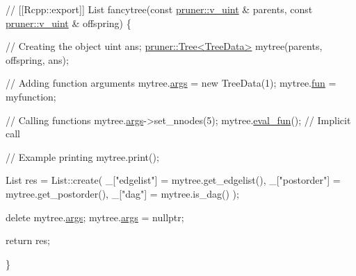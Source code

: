 \begin{DoxyCodeInclude}
{{{{\textcolor{comment}{// [[Rcpp::export]]}
List fancytree(\textcolor{keyword}{const} \hyperlink{namespacepruner_af0145646bd7ede012cd336b416bc5579}{pruner::v\_uint} & parents, \textcolor{keyword}{const} 
      \hyperlink{namespacepruner_af0145646bd7ede012cd336b416bc5579}{pruner::v\_uint} & offspring) \{
  
  \textcolor{comment}{// Creating the object}
  uint ans;
  \hyperlink{classpruner_1_1Tree}{pruner::Tree<TreeData>} mytree(parents, offspring, ans);
  
  \textcolor{comment}{// Adding function arguments}
  mytree.\hyperlink{classpruner_1_1Tree_add57f4e3ee3a539a3f1d95772c607e1b}{args} = \textcolor{keyword}{new} TreeData(1);
  mytree.\hyperlink{classpruner_1_1Tree_adc2f509b8bf17ba16364632c17870c87}{fun} = myfunction;
  
  \textcolor{comment}{// Calling functions}
  mytree.\hyperlink{classpruner_1_1Tree_add57f4e3ee3a539a3f1d95772c607e1b}{args}->set\_nnodes(5);
  mytree.\hyperlink{classpruner_1_1Tree_a5e079a7857ea4c7e44f339d64c77c7fe}{eval\_fun}();   \textcolor{comment}{// Implicit call}
  
  \textcolor{comment}{// Example printing}
  mytree.print();
  
  List res = List::create(
    \_[\textcolor{stringliteral}{"edgelist"}]  = mytree.get\_edgelist(),
    \_[\textcolor{stringliteral}{"postorder"}] = mytree.get\_postorder(),
    \_[\textcolor{stringliteral}{"dag"}]       = mytree.is\_dag()
  );
  
  \textcolor{keyword}{delete} mytree.\hyperlink{classpruner_1_1Tree_add57f4e3ee3a539a3f1d95772c607e1b}{args};
  mytree.\hyperlink{classpruner_1_1Tree_add57f4e3ee3a539a3f1d95772c607e1b}{args} = \textcolor{keyword}{nullptr};
  
  \textcolor{keywordflow}{return} res;
  
\}

}}}}
\end{DoxyCodeInclude}
